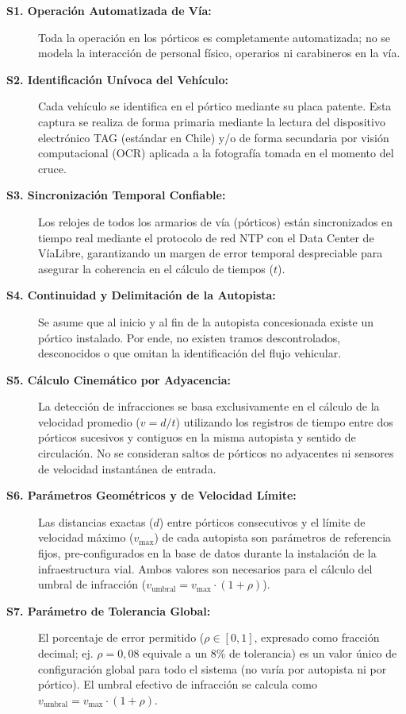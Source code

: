 \documentclass[12pt,letterpaper]{article}
\begin{document}
\begin{description}
	\item[\textbf{S1. Operación Automatizada de Vía:}] Toda la operación en los pórticos es completamente automatizada; no se modela la interacción de personal físico, operarios ni carabineros en la vía.

	\item[\textbf{S2. Identificación Unívoca del Vehículo:}] Cada vehículo se identifica en el pórtico mediante su placa patente. Esta captura se realiza de forma primaria mediante la lectura del dispositivo electrónico TAG (estándar en Chile) y/o de forma secundaria por visión computacional (OCR) aplicada a la fotografía tomada en el momento del cruce.

	\item[\textbf{S3. Sincronización Temporal Confiable:}] Los relojes de todos los armarios de vía (pórticos) están sincronizados en tiempo real mediante el protocolo de red NTP con el Data Center de VíaLibre, garantizando un margen de error temporal despreciable para asegurar la coherencia en el cálculo de tiempos ($t$).

	\item[\textbf{S4. Continuidad y Delimitación de la Autopista:}] Se asume que al inicio y al fin de la autopista concesionada existe un pórtico instalado. Por ende, no existen tramos descontrolados, desconocidos o que omitan la identificación del flujo vehicular.

	\item[\textbf{S5. Cálculo Cinemático por Adyacencia:}] La detección de infracciones se basa exclusivamente en el cálculo de la velocidad promedio ($v = d/t$) utilizando los registros de tiempo entre dos pórticos sucesivos y contiguos en la misma autopista y sentido de circulación. No se consideran saltos de pórticos no adyacentes ni sensores de velocidad instantánea de entrada.

	\item[\textbf{S6. Parámetros Geométricos y de Velocidad Límite:}] Las distancias exactas ($d$) entre pórticos consecutivos y el límite de velocidad máximo ($v_{\text{max}}$) de cada autopista son parámetros de referencia fijos, pre-configurados en la base de datos durante la instalación de la infraestructura vial. Ambos valores son necesarios para el cálculo del umbral de infracción ($v_{\text{umbral}} = v_{\text{max}} \cdot (1+\rho)$).

	\item[\textbf{S7. Parámetro de Tolerancia Global:}] El porcentaje de error permitido ($\rho \in [0,1]$, expresado como fracción decimal; ej. $\rho = 0{,}08$ equivale a un 8\% de tolerancia) es un valor único de configuración global para todo el sistema (no varía por autopista ni por pórtico). El umbral efectivo de infracción se calcula como $v_{\text{umbral}} = v_{\text{max}} \cdot (1 + \rho)$.


\end{description}
\end{document}
